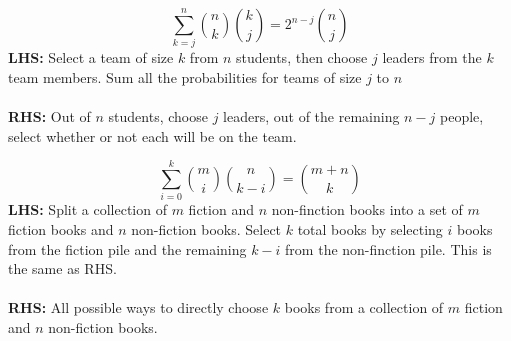 \documentclass{article}\usepackage{amsmath,amssymb,amsthm,tikz,tkz-graph,color,chngpage,soul,hyperref,csquotes,graphicx,floatrow, listings}\newcommand*{\QEDB}{\hfill\ensuremath{\square}}\newtheorem*{prop}{Proposition}\renewcommand{\theenumi}{\alph{enumi}}\usepackage[shortlabels]{enumitem}\usepackage[nobreak=true]{mdframed}\usetikzlibrary{matrix,calc}\MakeOuterQuote{"}\usepackage[margin=0.75in]{geometry} \newtheorem{theorem}{Theorem}\newcommand{\Z}{\mathbb Z}\newcommand{\R}{\mathbb R}\newcommand{\Q}{\mathbb Q}\newcommand{\N}{\mathbb N}\newcommand{\x}[1]{\textrm{ #1 }}\newcommand{\pr}{\textrm{Pr}}
\newcommand{\sumlim}[3]{\sum\limits_{#1}^{#2}#3}
\newcommand{\eq}[1]{\begin{equation}#1\end{equation}}
\begin{document}
\begin{mdframed}
\eq{\sumlim{k=j}{n}\binom{n}{k}\binom{k}{j}=2^{n-j}\binom{n}{j}}
\textbf{LHS:} Select a team of size $k$ from $n$ students, then choose $j$ leaders from the $k$ team members. Sum all the probabilities for teams of size $j$ to $n$ \\\\
\textbf{RHS:} Out of $n$ students, choose $j$ leaders, out of the remaining $n-j$ people, select whether or not each will be on the team.
\end{mdframed}
\begin{mdframed}
\eq{\sumlim{i=0}{k}\binom{m}{i}\binom{n}{k-i}=\binom{m+n}{k}}
\textbf{LHS:} Split a collection of $m$ fiction and $n$ non-finction books into a set of $m$ fiction books and $n$ non-fiction books. Select $k$ total books by selecting $i$ books from the fiction pile and the remaining $k-i$ from the non-finction pile. This is the same as RHS.\\\\
\textbf{RHS:} All possible ways to directly choose $k$ books from a collection of $m$ fiction and $n$ non-fiction books.
\end{mdframed}
\end{document}
